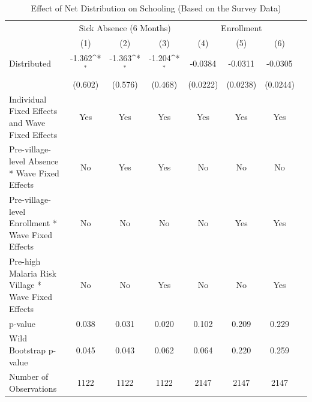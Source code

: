 \documentclass[fleqn,11pt]{article}
\newcommand{\sym}[1]{\rlap{$#1$}}
\def\sym#1{\ifmmode^{#1}\else\(^{#1}\)\fi
}
\begin{document}

\begin{table}[h]
\caption{Effect of Net Distribution on Schooling (Based on the Survey Data)}
\label{t:absence3rd_questionnaire_child}\centering
\begin{adjustbox}{max width=\textwidth}
\begin{threeparttable}
\begin{tabular}{l*{7}{c}}
\hline\hline
          &\multicolumn{3}{c}{Sick Absence (6 Months)}&\multicolumn{3}{c}{Enrollment}\\   \cmidrule(lr){2-4} \cmidrule(lr){5-7}
                          &\multicolumn{1}{c}{(1)}&\multicolumn{1}{c}{(2)}&\multicolumn{1}{c}{(3)}&\multicolumn{1}{c}{(4)}&\multicolumn{1}{c}{(5)}&\multicolumn{1}{c}{(6)}\\

\hline
Distributed         &         -1.362\sym{*}  &      -1.363\sym{*}  &      -1.204\sym{*}      &          -0.0384         &     -0.0311         &     -0.0305 \\
                   &     (0.602)         &     (0.576)         &     (0.468)                 &     (0.0222)         &    (0.0238)         &    (0.0244)         \\

Individual Fixed Effects and Wave Fixed Effects &         Yes         &         Yes         &         Yes         &         Yes         &         Yes         &         Yes         \\

Pre-village-level Absence * Wave Fixed Effects&          No         &         Yes         &         Yes         &          No         &         No         &         No         \\

Pre-village-level Enrollment * Wave Fixed Effects&       No         &          No     & No&     No         &         Yes         &         Yes         \\

Pre-high Malaria Risk Village * Wave Fixed Effects&          No         &          No         &         Yes         &          No         &          No         &         Yes         \\
\hline
p-value             &       0.038         &       0.031         &       0.020         &       0.102         &       0.209         &       0.229         \\
Wild Bootstrap p-value &       0.045         &       0.043         &       0.062         &       0.064         &       0.220         &       0.259         \\
Number of Observations        &        1122         &        1122         &        1122         &      2147         &        2147         &        2147         \\
                    

\end{tabular}
\end{threeparttable}
\end{adjustbox}
\end{table}
\end{document}
